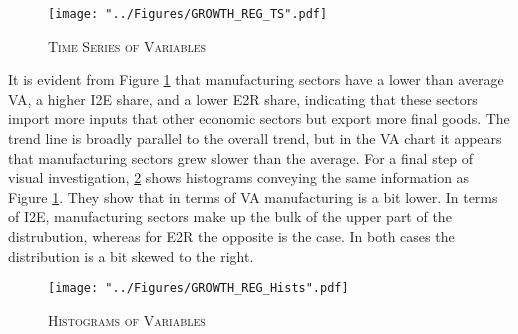 \documentclass[a4paper]{article}
\begin{document}
\begin{figure}[h!]
\centering
\caption{\label{fig:GROWTH_REG_TS}\textsc{Time Series of Variables}}
\texttt{[image: "../Figures/GROWTH\_REG\_TS".pdf]} %
\end{figure}
\FloatBarrier

It is evident from Figure \ref{fig:GROWTH_REG_TS} that manufacturing sectors have a lower than average VA, a higher I2E share, and a lower E2R share, indicating that these sectors import more inputs that other economic sectors but export more final goods. The trend line is broadly parallel to the overall trend, but in the VA chart it appears that manufacturing sectors grew slower than the average. For a final step of visual investigation, \ref{fig:GROWTH_REG_Hists} shows histograms conveying the same information as Figure \ref{fig:GROWTH_REG_TS}. They show that in terms of VA manufacturing is a bit lower. %
In terms of I2E, manufacturing sectors make up the bulk of the upper part of the distrubution, whereas for E2R the opposite is the case. In both cases the distribution is a bit skewed to the right. 

\begin{figure}[h!]
\centering
\caption{\label{fig:GROWTH_REG_Hists}\textsc{Histograms of Variables}}
\texttt{[image: "../Figures/GROWTH\_REG\_Hists".pdf]} %
\end{figure}
\FloatBarrier
\end{document}
